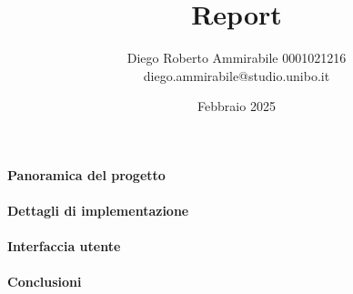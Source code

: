 \documentclass[12pt]{article}
\author{Diego Roberto Ammirabile 0001021216 \\ diego.ammirabile@studio.unibo.it}
\date{Febbraio 2025}
\title{Report}
\begin{document}
\paragraph{Panoramica del progetto}

\paragraph{Dettagli di implementazione}

\paragraph{Interfaccia utente}

\paragraph{Conclusioni}
\end{document}
